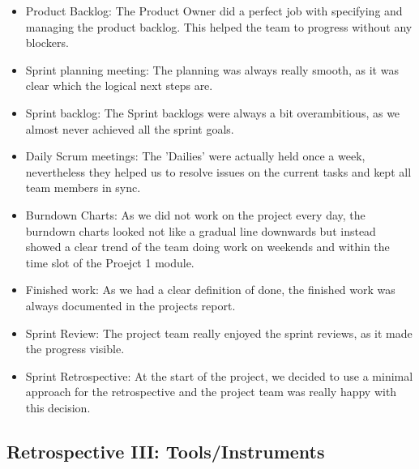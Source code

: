 \begin{itemize}
    \item Product Backlog: The Product Owner did a perfect job with specifying and managing the product backlog. This helped the team to progress without any blockers.
    \item Sprint planning meeting: The planning was always really smooth, as it was clear which the logical next steps are.
    \item Sprint backlog: The Sprint backlogs were always a bit overambitious, as we almost never achieved all the sprint goals.
    \item Daily Scrum meetings: The 'Dailies' were actually held once a week, nevertheless they helped us to resolve issues on the current tasks and kept all team members in sync.
    \item Burndown Charts: As we did not work on the project every day, the burndown charts looked not like a gradual line downwards but instead showed a clear trend of the team doing work on weekends and within the time slot of the Proejct 1 module.
    \item Finished work: As we had a clear definition of done, the finished work was always documented in the projects report.
    \item Sprint Review: The project team really enjoyed the sprint reviews, as it made the progress visible.
    \item Sprint Retrospective: At the start of the project, we decided to use a minimal approach for the retrospective and the project team was really happy with this decision.
\end{itemize}

\subsection{Retrospective III: Tools/Instruments}\label{subsec:retrospective-tools-instruments}

